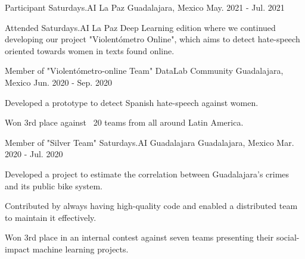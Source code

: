 

\begin{cventries}

\cventry
    {Participant} %
    {Saturdays.AI La Paz} %
    {Guadalajara, Mexico} %
    {May. 2021 - Jul. 2021} %
    {
      \begin{cvitems} %
        \item {Attended Saturdays.AI La Paz Deep Learning edition where we continued developing our project "Violentómetro Online", which aims to detect hate-speech oriented towards women in texts found online.}
      \end{cvitems}
    }

  \cventry
    {Member of "Violentómetro-online Team"} %
    {DataLab Community} %
    {Guadalajara, Mexico} %
    {Jun. 2020 - Sep. 2020} %
    {
      \begin{cvitems} %
        \item {Developed a prototype to detect Spanish hate-speech against women.}
        \item {Won 3rd place against ~20 teams from all around Latin America.}
      \end{cvitems}
    }

  \cventry
    {Member of "Silver Team"} %
    {Saturdays.AI Guadalajara} %
    {Guadalajara, Mexico} %
    {Mar. 2020 - Jul. 2020} %
    {
      \begin{cvitems} %
        \item {Developed a project to estimate the correlation between Guadalajara's crimes and its public bike system.}
        \item {Contributed by always having high-quality code and enabled a distributed team to maintain it effectively.}
        \item {Won 3rd place in an internal contest against seven teams presenting their social-impact machine learning projects.}
      \end{cvitems}
    }


\end{cventries}
